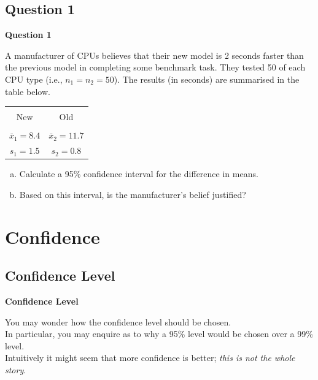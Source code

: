 \documentclass[compress]{beamer}        %
\makeatletter
\newcommand{\tcb}{\textcolor{beamer@blendedblue}}
\makeatother
\begin{document}
\subsection{Question 1}
\begin{frame}{\bf \tcb{Question 1}}

A manufacturer of CPUs believes that their new model is 2 seconds faster than the previous model in completing some benchmark task. They tested 50 of each CPU type (i.e., $n_1 = n_2 = 50$). The results (in seconds) are summarised in the table below.
\begin{center}
\begin{tabular}{|c|c|}
\hline
&\\[-0.4cm]
New & Old \\
\hline
&\\[-0.4cm]
$\bar x_1 = 8.4$ & $\bar x_2 = 11.7$ \\
$s_1 = 1.5$ & $s_2 = 0.8$ \\
\hline
\end{tabular}
\end{center}
\begin{enumerate}[a)]\itemsep0.3cm
\item Calculate a 95\% confidence interval for the difference in means.
\item Based on this interval, is the manufacturer's belief justified?
\end{enumerate}

\end{frame}



\section{Confidence}
\subsection{Confidence Level}
\begin{frame}{\bf \tcb{Confidence Level}}

You may wonder how the confidence level should be chosen.\\[1cm]

In particular, you may enquire as to why a 95\% level would be chosen over a 99\% level.\\[1cm]

Intuitively it might seem that more confidence is better; \emph{this is not the whole story}.

\end{frame}
\end{document}
